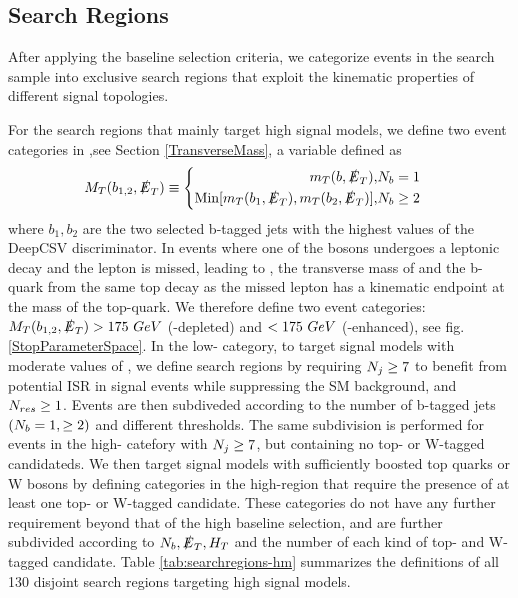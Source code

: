 \subsection{Search Regions}\label{SearchRegions}

After applying the baseline selection criteria, we categorize events in the search sample into exclusive search regions that exploit the kinematic properties of different signal topologies. 

For the search regions that mainly target high \dm{} signal models, we define two event categories in \mtb,see Section \ref{TransverseMass}, a variable defined as
\begin{equation}
M_{T}(b_{1,2},\slashed{E}_{T})\equiv
\begin{cases}
\begin{split}
m_T(b,\slashed{E}_{T}), &N_{b}=1 \\
\text{Min}[m_T(b_1, \slashed{E}_{T}),m_T(b_2,\slashed{E}_{T})], &N_{b}\geq2 \\
\end{split}
\end{cases}
\end{equation}
where $b_1, b_2$ are the two selected b-tagged jets with the highest values of the DeepCSV discriminator. In \ttbar{} events where one of the \W{} bosons undergoes a leptonic decay and the lepton is missed, leading to \met{}, the transverse mass of \met{} and the b-quark from the same top decay as the missed lepton has a kinematic endpoint at the mass of the top-quark. We therefore define two event categories: $M_{T}(b_{1,2},\slashed{E}_{T})>175~GeV$ (\ttbar-depleted) and $< 175~GeV$ (\ttbar-enhanced), see fig. \ref{StopParameterSpace}. In the low-\mtb{} category, to target signal models with moderate values of \dm, we define search regions by requiring $N_{j}\geq7$ to benefit from potential ISR in signal events while suppressing the SM background, and $N_{res}\geq1$. Events are then subdiveded according to the number of b-tagged jets $(N_{b}=1,\geq2)$ and different \met{} thresholds. The same subdivision is performed for events in the high-\mtb{} catefory with $N_{j}\geq7$, but containing no top- or W-tagged candidateds. We then target signal models with sufficiently boosted top quarks or W bosons by defining categories in the high-\mtb region that require the presence of at least one top- or W-tagged candidate. These categories do not have any further \nj{} requirement beyond that of the high \dm{} baseline selection, and are further subdivided according to $N_{b}, \slashed{E}_{T}, H_{T}$ and the number of each kind of top- and W-tagged candidate. Table \ref{tab:searchregions-hm} summarizes the definitions of all 130 disjoint search regions targeting high \dm{} signal models.

